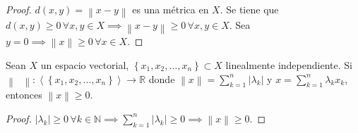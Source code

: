 \begin{proof}
    \begin{math}
        d\left(x,y\right)=
        \left\|x-y\right\|
    \end{math}
    es una métrica
    en $X$.
    Se tiene que
    \begin{math}
        d\left(x,y\right)\geq
        0\,\forall
        x,y\in X\implies
        \left\|x-y\right\|\geq
        0\,\forall x,y\in X
    \end{math}.
    Sea
    \begin{math}
        y=
        0\implies
        \left\|x\right\|\geq
        0\,\forall
        x\in X
    \end{math}.
\end{proof}

\begin{proposition*}
    Sean $X$ un espacio vectorial,
    \begin{math}
        \left\{
        x_{1},x_{2},\dotsc,x_{n}
        \right\}\subset
        X
    \end{math}
    linealmente independiente.
    Si
    \begin{math}
        \left\|\phantom{\cdot}\right\|\colon
        \left\langle
        \left\{
        x_{1},x_{2},\dotsc,x_{n}
        \right\}
        \right\rangle\to
        \mathbb{R}
    \end{math}
    donde
    \begin{math}
        \left\|x\right\|=
        \sum_{k=1}^{n}
        \left|
        \lambda_{k}
        \right|
    \end{math}
    y
    \begin{math}
        x=
        \sum_{k=1}^{n}
        \lambda_{k}x_{k}
    \end{math},
    entonces
    \begin{math}
        \left\|
        x
        \right\|\geq
        0
    \end{math}.
\end{proposition*}

\begin{proof}
    \begin{math}
        \left|
        \lambda_{k}
        \right|\geq
        0\,\forall
        k\in\mathbb{N}\implies
        \sum_{k=1}^{n}
        \left|
        \lambda_{k}
        \right|\geq
        0\implies
        \left\|
        x
        \right\|\geq
        0
    \end{math}.
\end{proof}

